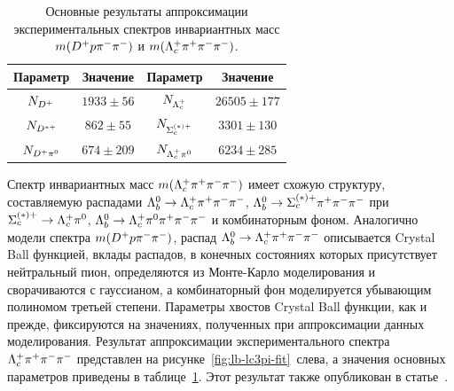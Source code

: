 \begin{table}[b!]%
  \centering
  \caption{Основные результаты аппроксимации экспериментальных спектров 
  инвариантных масс $m({D^+}{p}{\pi^-}{\pi^-})$ и $m({\Lambda_c^+}{\pi^+}{\pi^-}{\pi^-})$.}
  \label{tab:lb-fit-results}
  \begin{tabular}{|c|c|c|c|}
    \hline
    Параметр & Значение & Параметр & Значение \\
    \hline
    $N_{D^+}$        & $1933 \pm  56$ &  $N_{\Lambda_c^+}$        & $26505 \pm 177$\\
    $N_{D^{*+}}$    & $ 862 \pm  55$ &  $N_{\Sigma_c^{(*)+}}$& $ 3301 \pm 130$\\
    $N_{{D^+}{\pi^0}}$  & $ 674 \pm 209$ &  $N_{{\Lambda_c^+}{\pi^0}}$  & $ 6234 \pm 285$\\
    \hline
  \end{tabular}
\end{table}%

\begingroup \par \sloppy
Спектр инвариантных масс $m({\Lambda_c^+}{\pi^+}{\pi^-}{\pi^-})$ имеет схожую структуру, 
составляемую распадами $\Lb\to\Lc\pip\pim\pim$, 
$\Lb\to\Scoptstarp\pip\pim\pim$ при \mbox{$\Scoptstarp\to\Lc\piz$}, 
$\Lb\to\Lc\piz\pip\pim\pim$ и комбинаторным фоном. Аналогично модели 
спектра $m({D^+}{p}{\pi^-}{\pi^-})$, распад $\Lb\to\Lc\pip\pim\pim$ описывается 
Crystal Ball функцией, вклады распадов, в конечных состояниях которых 
присутствует нейтральный пион, определяются из Монте-Карло моделирования 
и сворачиваются с гауссианом, а комбинаторный фон моделируется убывающим 
полиномом третьей степени. Параметры хвостов Crystal Ball функции, как 
и прежде, фиксируются на значениях, полученных при аппроксимации данных 
моделирования. Результат аппроксимации экспериментального спектра 
${\Lambda_c^+}{\pi^+}{\pi^-}{\pi^-}$ представлен на рисунке~\ref{fig:lb-lc3pi-fit}~слева, 
а значения основных параметров приведены 
в таблице~\ref{tab:lb-fit-results}. Этот результат также опубликован 
в статье~\cite{lb2dppipi-paper}.
\par \endgroup
